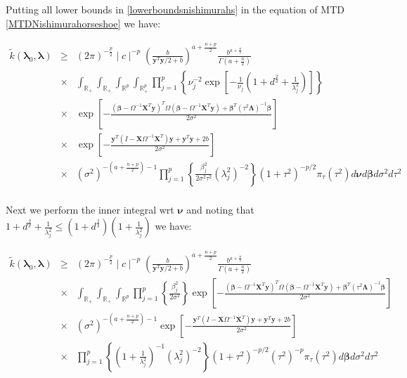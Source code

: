 \documentclass[noinfoline,11pt]{imsart}
\numberwithin{equation}{section}
\theoremstyle{plain}
\newcommand{\y}{\mathbf{y}}
\newcommand{\X}{\mathbf{X}}
\newcommand{\bl}{\boldsymbol{\lambda}}
\newcommand{\Bl}{\boldsymbol{\Lambda}}
\begin{document}
\noindent

Putting all lower bounds in \eqref{lowerboundsnishimurahs} in the equation of MTD \eqref{MTDNishimurahorseshoe} we have:

\begin{eqnarray*}\label{minorizationproof}
\tilde k\left(\bl_0,\bl\right) 
&\geq& \left(2\pi\right)^{-\frac{p}{2}}\mid c\mid ^{-p}\left(\frac{b}{\y^T\y/2+b}\right)^{a+\frac{n+p}{2}}\frac{b^{a+\frac{n}{2}}}{\Gamma\left(a+\frac{n}{2}\right)} \nonumber \\ 
&\times& \int_{\mathbb{R}_+}\int_{\mathbb{R}_+}\int_{\mathbb{R}^p}\int_{\mathbb{R}_+^p}\prod_{j=1}^p\left\{\nu_j^{-2}\exp{\left[-\frac{1}{\nu_j}\left(1+d^{\frac{2}{\delta}}+\frac{1}{\lambda_j^2}\right)\right]}\right\}\nonumber \\
&\times& \exp{\left[-\frac{\left(\boldsymbol{\beta}-\Omega^{-1}\X^T\y\right)^T \Omega\left(\boldsymbol{\beta}-\Omega^{-1}\X^T\y\right)+\boldsymbol{\beta}^T\left(\tau^2\Bl\right)^{-1}\boldsymbol{\beta}}{2\sigma^2}\right]}\nonumber \\
&\times&\exp{\left[-\frac{\y^T\left(I-\X \Omega^{-1}\X^T\right)\y+\y^T\y+2b}{2\sigma^2}\right]} \nonumber \\
&\times& \left(\sigma^2\right)^{-\left(a+\frac{n+p}{2}\right)-1}\prod_{j=1}^p\left\{\frac{\beta_j^2}{2\sigma^2\tau^2}\left(\lambda_j^2\right)^{-2}\right\}\left(1+\tau^2\right)^{-p/2}\pi_\tau\left(\tau^2\right)d\boldsymbol{\nu}d\boldsymbol{\beta}d\sigma^2d\tau^2\nonumber \\
\end{eqnarray*}

\noindent
Next we perform the inner integral wrt $\boldsymbol \nu$ and noting that $1+d^{\frac{2}{\delta}}+\frac{1}{\lambda_j^2}\leq \left(1+d^{\frac{2}{\delta}}\right)\left(1+\frac{1}{\lambda_j^2}\right)$ we have:

\begin{eqnarray*}
\tilde k\left(\bl_0,\bl\right) 
&\geq& \left(2\pi\right)^{-\frac{p}{2}}\mid c\mid ^{-p}\left(\frac{b}{\y^T\y/2+b}\right)^{a+\frac{n+p}{2}}\frac{b^{a+\frac{n}{2}}}{\Gamma\left(a+\frac{n}{2}\right)} \nonumber \\ 
&\times& \int_{\mathbb{R}_+}\int_{\mathbb{R}_+}\int_{\mathbb{R}^p}\prod_{j=1}^p\left\{\frac{\beta_j^2}{2\sigma^2}\right\}\exp{\left[-\frac{\left(\boldsymbol{\beta}-\Omega^{-1}\X^T\y\right)^T \Omega\left(\boldsymbol{\beta}-\Omega^{-1}\X^T\y\right)+\boldsymbol{\beta}^T\left(\tau^2\Bl\right)^{-1}\boldsymbol{\beta}}{2\sigma^2}\right]}\nonumber \\
&\times& \left(\sigma^2\right)^{-\left(a+\frac{n+p}{2}\right)-1}\exp{\left[-\frac{\y^T\left(I-\X \Omega^{-1}\X^T\right)\y+\y^T\y+2b}{2\sigma^2}\right]} \nonumber \\
&\times& \prod_{j=1}^p\left\{\left(1+\frac{1}{\lambda_j^2}\right)^{-1}\left(\lambda_j^2\right)^{-2}\right\}\left(1+\tau^2\right)^{-p/2}\left(\tau^2\right)^{-p}\pi_\tau\left(\tau^2\right)d\boldsymbol{\beta}d\sigma^2d\tau^2\nonumber \\
\end{eqnarray*}
\end{document}
